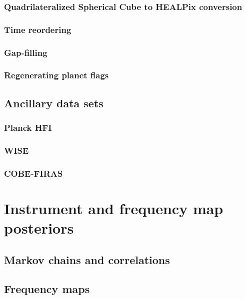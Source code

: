 \documentclass{aa}
\begin{document}
\subsubsection{Quadrilateralized Spherical Cube to HEALPix conversion}
\subsubsection{Time reordering}
\subsubsection{Gap-filling}
\subsubsection{Regenerating planet flags}

\subsection{Ancillary data sets}

\subsubsection{Planck HFI}

\subsubsection{WISE}

\subsubsection{COBE-FIRAS}





\clearpage
\section{Instrument and frequency map posteriors}

\subsection{Markov chains and correlations}

\subsection{Frequency maps}
\end{document}
